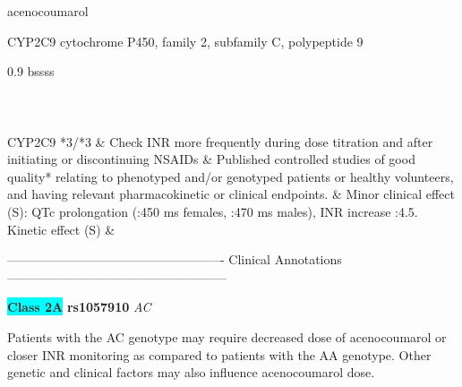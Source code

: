 \documentclass{resume} %
\begin{document}
\begin{rSection}{ acenocoumarol }
\begin{rSubsection}{ CYP2C9 }{ cytochrome P450, family 2, subfamily C, polypeptide 9 }{}{}
\begin{center}
\begin{tabularx}{0.9\textwidth}{ bssss }
\\
		\vspace{1pt}\\
		\hline \\
		\vspace{1pt}\\
		         CYP2C9 *3/*3 & Check INR more frequently during dose titration and after initiating or discontinuing NSAIDs & Published controlled studies of good quality* relating to phenotyped and/or genotyped patients or healthy volunteers, and having relevant pharmacokinetic or clinical endpoints. & Minor clinical effect (S): QTc prolongation (:450 ms females, :470 ms males),  INR increase :4.5. Kinetic effect (S) &
\\
		\end{tabularx}
		\end{center}
		\normalsize
		\vspace{10pt}
		        
\item[] ---------------------------------------------------- Clinical Annotations -----------------------------------------------------\newline
\item \textbf{\colorbox{cyan} {Class 2A}} \textbf{ rs1057910 } \textit{ AC }
\item[] Patients with the AC genotype may require decreased dose of acenocoumarol or closer INR monitoring as compared to patients with the AA genotype. Other genetic and clinical factors may also influence acenocoumarol dose.

\end{rSubsection}


\end{rSection}
\end{document}
